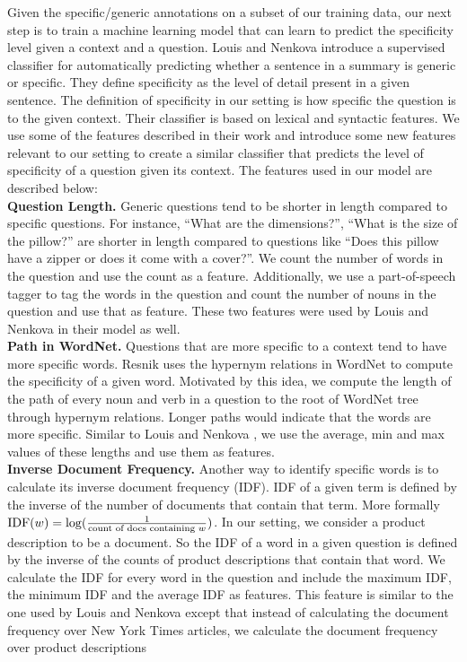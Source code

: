 \documentclass[11pt,a4paper]{article}
\begin{document}
Given the specific/generic annotations on a subset of our training data, our next step is to train a machine learning model that can learn to predict the specificity level given a context and a question. Louis and Nenkova  \cite{louis2011automatic} introduce a supervised classifier for automatically predicting whether a sentence in a summary is generic or specific. They define specificity as the level of detail present in a given sentence. The definition of specificity in our setting is how specific the question is to the given context.  Their classifier is based on lexical and syntactic features. We use some of the features described in their work and introduce some new features relevant to our setting to create a similar classifier that predicts the level of specificity of a question given its context. The features used in our model are described below: \\

\noindent \textbf{Question Length.} Generic questions tend to be shorter in length compared to specific questions. For instance, ``What are the dimensions?'', ``What is the size of the pillow?'' are shorter in length compared to questions like ``Does this pillow have a zipper or does it come with a cover?''. We count the number of words in the question and use the count as a feature. Additionally, we use a part-of-speech tagger to tag the words in the question and count the number of nouns in the question and use that as feature. These two features were used by Louis and Nenkova \cite{louis2011automatic} in their model as well.\\

\noindent \textbf{Path in WordNet.} Questions that are more specific to a context tend to have more specific words. Resnik \cite{resnik1995using} uses the hypernym relations in WordNet \cite{miller1990introduction} to compute the specificity of a given word. Motivated by this idea, we compute the length of the path of every noun and verb in a question to the root of WordNet tree through hypernym relations. Longer paths would indicate that the words are more specific. Similar to Louis and Nenkova \cite{louis2011automatic}, we use the average, min and max values of these lengths and use them as features. \\

\noindent \textbf{Inverse Document Frequency.} Another way to identify specific words is to calculate its inverse document frequency (IDF). IDF of a given term is defined by the inverse of the number of documents that contain that term. More formally $\textnormal{IDF}(w) = \log (\frac{1}{\text{count of docs containing } w })$. In our setting, we consider a product description to be a document. So the IDF of a word in a given question is defined by the inverse of the counts of product descriptions that contain that word. We calculate the IDF for every word in the question and include the maximum IDF, the minimum IDF and the average IDF as features. This feature is similar to the one used by Louis and Nenkova \cite{louis2011automatic}  except that instead of calculating the document frequency over New York Times articles, we calculate the document frequency over product descriptions\\
\end{document}
